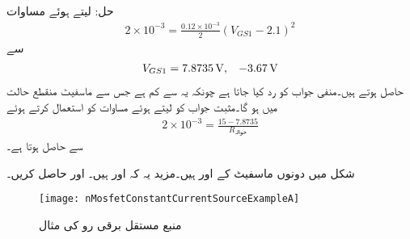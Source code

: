 حل: لیتے ہوئے مساوات 
\begin{align*}
2 \times 10^{-3}=\frac{0.12 \times 10^{-3}}{2} \left(V_{GS1}-2.1 \right)^2
\end{align*}
سے
\begin{align*}
V_{GS1}=\SI{7.8735}{\volt}, \hspace{3mm} \SI{-3.67}{\volt}
\end{align*}
 حاصل ہوتے ہیں۔منفی جواب کو رد کیا جاتا ہے چونکہ یہ  سے کم ہے جس سے ماسفیٹ منقطع حالت میں ہو گا۔مثبت جواب کو لیتے ہوئے مساوات  کو استعمال کرتے ہوئے
\begin{align*}
2 \times 10^{-3}=\frac{15-7.8735}{R_{\textrm{حوالہ}}}
\end{align*}
سے  حاصل ہوتا ہے۔

شکل  میں دونوں ماسفیٹ کے  اور  ہیں۔مزید یہ کہ  اور  ہیں۔ اور  حاصل کریں۔

\begin{figure}
\centering
\texttt{[image: nMosfetConstantCurrentSourceExampleA]}
\caption{منبع مستقل برقی رو کی مثال}
\label{شکل_ماسفیٹ_پیداکار_مستقل_برقی_رو_استعمال}
\end{figure}


